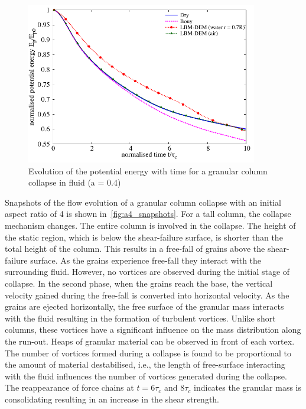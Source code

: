 \begin{figure}
	\centering
    \includegraphics[width=0.9\textwidth]{PE_a04f}
    \caption{Evolution of the potential energy with time for a granular column 
    collapse in fluid (a = 0.4)}
    \label{fig:PE_a04f}
\end{figure}


Snapshots of the flow evolution of a granular column collapse with an initial 
aspect ratio of 4 is shown in~\cref{fig:a4_snapshots}. For a tall column, the 
collapse mechanism changes. The entire column is involved in the collapse. The 
height of the static region, which is below the shear-failure surface, is 
shorter than the total height of the column. This results in a free-fall of 
grains above the shear-failure surface. As the grains experience free-fall they 
interact with the surrounding fluid. However, no vortices are observed during 
the initial stage of collapse. In the second phase, when the grains reach the 
base, the vertical velocity gained during the free-fall is converted into
horizontal velocity. As the grains are ejected horizontally, the free 
surface of the granular mass interacts with the fluid resulting in the 
formation of turbulent vortices. Unlike short columns, these vortices have 
a significant influence on the mass distribution along the run-out. Heaps of 
granular material can be observed in front of each vortex. The number of 
vortices formed during a collapse is found to be proportional to the amount of 
material destabilised, i.e., the length of free-surface interacting with the 
fluid influences the number of vortices generated during the collapse. The 
reappearance of force chains at $t = 6\tau_c$ and $8\tau_c$ indicates the 
granular mass is consolidating resulting in an increase in the shear strength. 

